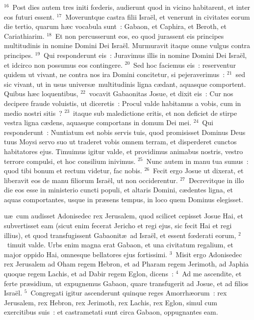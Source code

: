 ${}^{16}$~Post dies autem tres initi fœderis, audierunt quod in vicino habitarent, et inter eos futuri essent.
${}^{17}$~Moveruntque castra filii Isra\"el, et venerunt in civitates eorum die tertio, quarum h\ae c vocabula sunt~: Gabaon, et Caphira, et Beroth, et Cariathiarim.
${}^{18}$~Et non percusserunt eos, eo quod jurassent eis principes multitudinis in nomine Domini Dei Isra\"el. Murmuravit itaque omne vulgus contra principes.
${}^{19}$~Qui responderunt eis~: Juravimus illis in nomine Domini Dei Isra\"el, et idcirco non possumus eos contingere.
${}^{20}$~Sed hoc faciemus eis~: reserventur quidem ut vivant, ne contra nos ira Domini concitetur, si pejeraverimus~:
${}^{21}$~sed sic vivant, ut in usus univers\ae\ multitudinis ligna c\ae dant, aquasque comportent. Quibus h\ae c loquentibus,
${}^{22}$~vocavit Gabaonitas Josue, et dixit eis~: Cur nos decipere fraude voluistis, ut diceretis~: Procul valde habitamus a vobis, cum in medio nostri sitis~?
${}^{23}$~itaque sub maledictione eritis, et non deficiet de stirpe vestra ligna c\ae dens, aquasque comportans in domum Dei mei.
${}^{24}$~Qui responderunt~: Nuntiatum est nobis servis tuis, quod promisisset Dominus Deus tuus Moysi servo suo ut traderet vobis omnem terram, et disperderet cunctos habitatores ejus. Timuimus igitur valde, et providimus animabus nostris, vestro terrore compulsi, et hoc consilium inivimus.
${}^{25}$~Nunc autem in manu tua sumus~: quod tibi bonum et rectum videtur, fac nobis.
${}^{26}$~Fecit ergo Josue ut dixerat, et liberavit eos de manu filiorum Isra\"el, ut non occiderentur.
${}^{27}$~Decrevitque in illo die eos esse in ministerio cuncti populi, et altaris Domini, c\ae dentes ligna, et aquas comportantes, usque in pr\ae sens tempus, in loco quem Dominus elegisset.

\bchapter
{}u\ae\ cum audisset Adonisedec rex Jerusalem, quod scilicet cepisset Josue Hai, et subvertisset eam (sicut enim fecerat Jericho et regi ejus, sic fecit Hai et regi illius), et quod transfugissent Gabaonit\ae\ ad Isra\"el, et essent fœderati eorum,
${}^{2}$~timuit valde. Urbs enim magna erat Gabaon, et una civitatum regalium, et major oppido Hai, omnesque bellatores ejus fortissimi.
${}^{3}$~Misit ergo Adonisedec rex Jerusalem ad Oham regem Hebron, et ad Pharam regem Jerimoth, ad Japhia quoque regem Lachis, et ad Dabir regem Eglon, dicens~:
${}^{4}$~Ad me ascendite, et ferte pr\ae sidium, ut expugnemus Gabaon, quare transfugerit ad Josue, et ad filios Isra\"el.
${}^{5}$~Congregati igitur ascenderunt quinque reges Amorrh\ae orum~: rex Jerusalem, rex Hebron, rex Jerimoth, rex Lachis, rex Eglon, simul cum exercitibus suis~: et castrametati sunt circa Gabaon, oppugnantes eam.


